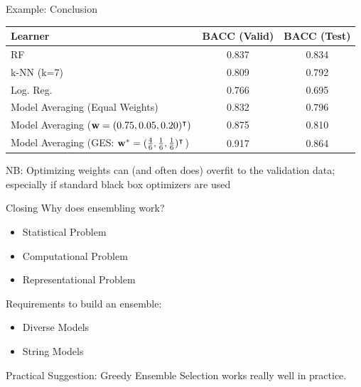 \documentclass[11pt,compress,t,notes=noshow, aspectratio=169, xcolor=table]{beamer}
\begin{document}
\begin{vbframe}{Example: Conclusion}
\begin{table}[h]
\centering
\begin{tabular}{lcc}
\hline
\textbf{Learner} & \textbf{BACC} (Valid) & \textbf{BACC} (Test) \\
\hline
RF & 0.837 & 0.834 \\
k-NN (k=7) & 0.809 & 0.792 \\
Log. Reg. & 0.766 & 0.695 \\
Model Averaging (Equal Weights) & 0.832 & 0.796 \\
Model Averaging ($\mathbf{w} = (0.75, 0.05, 0.20)^\intercal)$ & 0.875 & 0.810 \\
Model Averaging (GES: $\mathbf{w}^{*} = (\frac{4}{6}, \frac{1}{6}, \frac{1}{6})^\intercal$) & 0.917 & 0.864\\
\hline
\end{tabular}
\label{table:learners_valid_test_final}
\end{table}
\vfill
NB: Optimizing weights can (and often does) overfit to the validation data; especially if standard black box optimizers are used\\
\end{vbframe}


\begin{vbframe}{Closing}
\vfill
Why does ensembling work? \href{https://link.springer.com/content/pdf/10.1007/3-540-45014-9_1.pdf?pdf}{}
\begin{itemize}
    \item Statistical Problem
    \item Computational Problem
    \item Representational Problem
\end{itemize}
\vfill
Requirements to build an ensemble:
\begin{itemize}
    \item Diverse Models
    \item String Models
\end{itemize}
\vfill
Practical Suggestion: Greedy Ensemble Selection works really well in practice.
\vfill
\end{vbframe}



\endlecture
\end{document}
